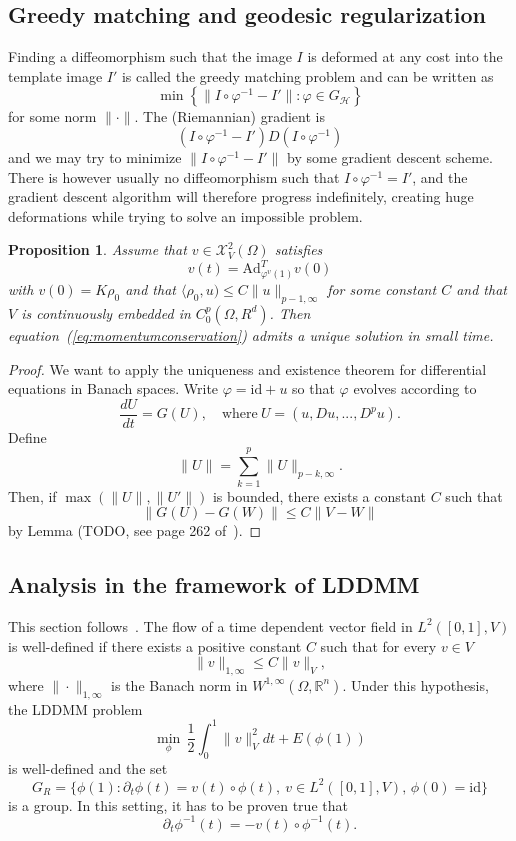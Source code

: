 \documentclass{article}
\theoremstyle{plain}
\newtheorem{prop}[teo]{Proposition}
\theoremstyle{definition}
\numberwithin{equation}{section}
\newcommand{\R}{\ensuremath{\mathbb{R}}}
\newcommand{\id}{\ensuremath{\mathrm{id}}}
\newcommand{\Ad}{\ensuremath{\mathrm{Ad}}}
\begin{document}
\subsection{Greedy matching and geodesic regularization}
Finding a diffeomorphism such that the image $I$ is deformed at any cost into the template image $I'$ is called the greedy matching problem and can be written as
\[
\min\left\{\|I\circ\varphi^{-1}-I'\| : \varphi\in G_\mathcal{H}\right\}
\]
for some norm $\|\cdot\|$. The (Riemannian) gradient is
\[
(I\circ\varphi^{-1}-I')D(I\circ\varphi^{-1})
\]
and we may try to minimize $\|I\circ\varphi^{-1}-I'\|$ by some gradient descent scheme. There is however usually no diffeomorphism such that $I\circ\varphi^{-1}=I'$, and the gradient descent algorithm will therefore progress indefinitely, creating huge deformations while trying to solve an impossible problem.


\begin{prop}
Assume that $v\in\mathcal{X}_V^2(\Omega)$ satisfies 
%
\begin{equation}
\label{eq:momentumconservation}
v(t)=\Ad_{\varphi^v(1)}^Tv(0)
\end{equation}
%
with $v(0)=K\rho_0$ and that $\langle \rho_0,u)\leq C\|u\|_{p-1,\infty}$ for some constant $C$ and that $V$ is continuously embedded in $C_0^p(\Omega,R^d)$. Then equation~(\ref{eq:momentumconservation}) admits a unique solution in small time.
\end{prop}

\begin{proof}
We want to apply the uniqueness and existence theorem for differential equations in Banach spaces. Write $\varphi=\id+u$ so that $\varphi$ evolves according to
\[
\frac{dU}{dt}=G(U),\quad\mathrm{where\ } U=(u,Du,...,D^pu).
\]
Define
\[
\|U\|=\sum_{k=1}^p \|U\|_{p-k,\infty}.
\]
Then, if $\max(\|U\|,\|U'\|)$ is bounded, there exists a constant $C$ such that
\[
\|G(U)-G(W)\|\leq C\|V-W\|
\]
by Lemma (TODO, see page 262 of~\cite{younes2010shapes}).
\end{proof}


\subsection{Analysis in the framework of LDDMM}
This section follows~\cite{schmah2015diffeomorphic}.
The flow of a time dependent vector field in $L^2([0,1],V)$ is well-defined if there exists a positive constant $C$ such that for every $v\in V$
\[
\|v\|_{1,\infty}\leq C\|v\|_V,
\]
where $\|\cdot\|_{1,\infty}$ is the Banach norm in $W^{1,\infty}(\Omega,\R^n)$. Under this hypothesis, the LDDMM problem
\[
  \min_\phi \,\frac{1}{2}\int_0^1\|v\|^2_Vdt + E(\phi(1))
\]
is well-defined and the set
\[
  G_R=\{\phi(1) : \partial_t\phi(t)=v(t)\circ\phi(t),\ v\in L^2([0,1],V),\,\phi(0)=\id\}
\]
is a group. In this setting, it has to be proven true that
\[
\partial_t\phi^{-1}(t)=-v(t)\circ \phi^{-1}(t).
\]
\end{document}
